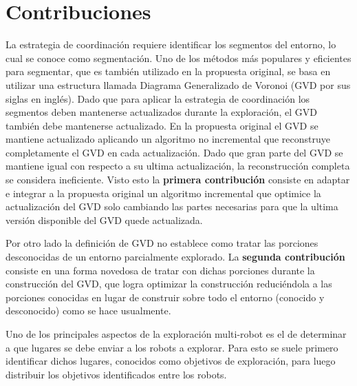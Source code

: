 \section{Contribuciones}\label{sec:cont}

La estrategia de coordinación requiere identificar los segmentos del entorno,
lo cual se conoce como segmentación. Uno de los métodos más populares y
eficientes para segmentar, que es también utilizado en la propuesta original, se
basa en utilizar una estructura llamada Diagrama Generalizado de Voronoi (GVD
por sus siglas en inglés). Dado que para aplicar la estrategia de coordinación
los segmentos deben mantenerse actualizados durante la exploración, el GVD
también debe mantenerse actualizado. En la propuesta original el GVD se
mantiene actualizado aplicando un algoritmo no incremental que
reconstruye completamente el GVD en cada actualización. Dado que gran parte del GVD se
mantiene igual con respecto a su ultima actualización, la reconstrucción
completa se considera ineficiente. Visto esto la \textbf{primera contribución}
consiste en adaptar e integrar a la propuesta original un algoritmo incremental
que optimice la actualización del GVD solo cambiando las partes necesarias para
que la ultima versión disponible del GVD quede actualizada. 


Por otro lado la definición de GVD no establece como tratar las porciones
desconocidas de un entorno parcialmente explorado. La \textbf{segunda contribución}
consiste en una forma novedosa de tratar con dichas porciones durante la
construcción del GVD, que logra optimizar la construcción reduciéndola a las porciones 
conocidas en lugar de construir sobre todo el entorno (conocido y desconocido)
como se hace usualmente.

Uno de los principales aspectos de la exploración multi-robot es el de
determinar a que lugares se debe enviar a los robots a explorar. Para esto se
suele primero identificar dichos lugares, conocidos como objetivos de
exploración, para luego distribuir los objetivos identificados entre los
robots.

